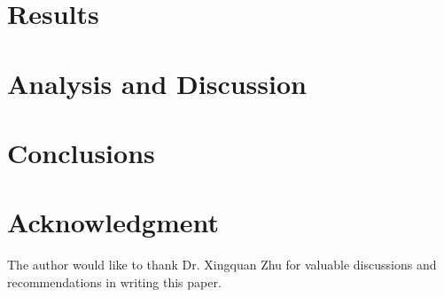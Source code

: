 \documentclass[conference]{IEEEtran}
\begin{document}
\section{Results}

\section{Analysis and Discussion}

\section{Conclusions}

\section*{Acknowledgment}
The author would like to thank Dr. Xingquan Zhu for valuable discussions and recommendations in writing this paper.


\end{document}
